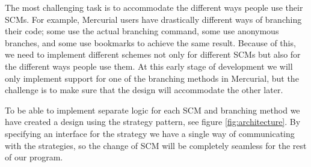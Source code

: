 \documentclass[a4paper]{article}
\begin{document}
The most challenging task is to accommodate the different ways people use their
SCMs.
For example, Mercurial users have drastically different ways of branching their
code; some use the actual branching command, some use anonymous branches, and
some use bookmarks to achieve the same result.
Because of this, we need to implement different schemes not only for different
SCMs but also for the different ways people use them.
At this early stage of development we will only implement support for one of the
branching methods in Mercurial, but the challenge is to make sure that the
design will accommodate the other later.

To be able to implement separate logic for each SCM and branching method we have
created a design using the strategy pattern, see figure \ref{fig:architecture}.
By specifying an interface for the strategy we have a single way of
communicating with the strategies, so the change of SCM will be completely
seamless for the rest of our program.
\end{document}
